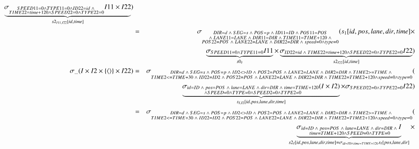 \begin{eqnarray*}
\underbrace{\sigma_{\substack{SPEED11 = 0 \wedge TYPE11 = 0 \wedge ID22 = id \;\wedge\; \\TIME22 = time + 120 \wedge SPEED22 = 0 \wedge TYPE22 =0 }} I11 \times I22}_{s2_{I11,I22}[id, time]})\\
&=&
\sigma_{\substack{DIR = d \;\wedge\; SEG = s \;\wedge\; POS = p \;\wedge\; ID11 = ID \;\wedge\; POS11 = POS \\\;\wedge\;  LANE11 = LANE \;\wedge\; DIR11=DIR \;\wedge\; TIME11 = TIME + 120 \;\wedge\; \\POS22 = POS \;\wedge\;  LANE22 = LANE \;\wedge\; DIR22 = DIR \;\wedge\; speed = 0 \wedge type = 0 }}(s_1[id, pos, lane, dir, time] \times \\
&&
\underbrace{\sigma_{SPEED11 = 0 \wedge TYPE11 = 0} I11}_{s0_{I}} \times \underbrace{\sigma_{ ID22 = id \;\wedge\; TIME22 = time + 120 \wedge SPEED22 = 0 \wedge TYPE22 =0 } I22}_{s2_{I22}[id, time]})\\
\sigma_{\dots}(I \times  I2 \times  \{\tuple{} \} \times I22) &=&
\sigma_{\substack{DIR = d \;\wedge\; SEG = s \;\wedge\; POS = p \;\wedge\; ID2 <> ID \;\wedge\; POS2 = POS \;\wedge\; LANE2 = LANE \;\wedge\; DIR2 = DIR \;\wedge\; TIME2 >= TIME \;\wedge\;\\ TIME2 <= TIME + 30 \;\wedge\;  ID22 = ID2 \;\wedge\; POS22 = POS \;\wedge\;  LANE22 = LANE \;\wedge\; DIR22 = DIR \;\wedge\; TIME22 = TIME2 + 120 \wedge  speed = 0 \wedge type = 0  }}(\\
&& \underbrace{\sigma_{\substack{id = ID \;\wedge\; pos = POS \;\wedge\;  lane = LANE \;\wedge\; dir=DIR \;\wedge\; time = TIME + 120\\ \wedge SPEED = 0 \wedge TYPE = 0 \wedge SPEED2 = 0 \wedge TYPE2 = 0 }} (I \times  I2)}_{s_{I, I2}[id, pos, lane, dir, time]} \times  
\sigma_{SPEED22 = 0 \wedge TYPE22 =0} I22) \\
&=& 
\sigma_{\substack{DIR = d \;\wedge\; SEG = s \;\wedge\; POS = p \;\wedge\; ID2 <> ID \;\wedge\; POS2 = POS \;\wedge\; LANE2 = LANE \;\wedge\; DIR2 = DIR \;\wedge\; TIME2 >= TIME \;\wedge\;\\ TIME2 <= TIME + 30 \;\wedge\;  ID22 = ID2 \;\wedge\; POS22 = POS \;\wedge\;  LANE22 = LANE \;\wedge\; DIR22 = DIR \;\wedge\; TIME22 = TIME2 + 120 \wedge  speed = 0 \wedge type = 0  }}(\\
&& \underbrace{\sigma_{\substack{id = ID \;\wedge\; pos = POS \;\wedge\;  lane = LANE \;\wedge\; dir=DIR \;\wedge\; \\time = TIME + 120 \wedge SPEED = 0 \wedge TYPE = 0}} I}_{s2_{I}[id, pos, lane, dir, time] = \sigma_{id = ID \wedge time = TIME +120} s_{I}[pos, lane, dir]} \times 

\end{eqnarray*}
